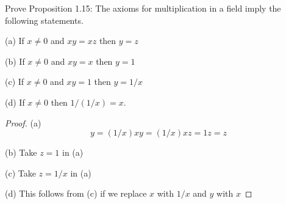 \documentclass[12pt]{article}
\newenvironment{problem}[2][Problem]{\begin{trivlist}
\item[\hskip \labelsep {\bfseries #1}\hskip \labelsep {\bfseries #2.}]}{\end{trivlist}}
\begin{document}
\begin{problem}{3}
Prove Proposition 1.15: The axioms for multiplication in a field imply the following statements.

(a) If $x\neq 0$ and $xy = xz$ then $y = z$

(b) If $x\neq 0$ and $xy = x$ then $y = 1$

(c) If $x\neq 0$ and $xy = 1$ then $y = 1/x$

(d) If $x\neq 0$ then $1/(1/x) = x$.

\end{problem}
\begin{proof}
(a) \begin{equation}
y = (1/x)xy = (1/x)xz = 1z = z
\end{equation}

(b) Take $z = 1$ in (a)

(c) Take $z = 1/x$ in (a)

(d) This follows from (c) if we replace $x$ with $1/x$ and $y$ with $x$
\end{proof}
\end{document}
